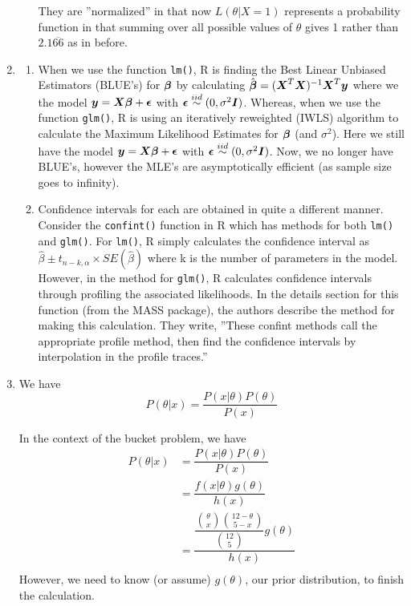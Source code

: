 \documentclass[12pt]{article}\usepackage[]{graphicx}\usepackage[]{color}
\newenvironment{knitrout}{}{} %
\newcommand{\bfbeta}{\mbox{\boldmath $\beta$}}
\newcommand{\bfX}{\mbox{\boldmath $X$}}
\newcommand{\bfI}{\mbox{\boldmath $I$}}
\newcommand{\bfy}{\mbox{\boldmath $y$}}
\newcommand{\bfeps}{\mbox{\boldmath $\epsilon$}}
\begin{document}
\begin{enumerate}
\begin{enumerate}[label=(\alph*)]
\begin{knitrout}
{}



\end{knitrout}

They are ''normalized'' in that now $L(\theta|X=1)$ represents a probability function in that summing over all possible values of $\theta$ gives 1 rather than $2.1\overline{66}$ as in before. 
\end{enumerate}

\item

\begin{enumerate}[label=(\alph*)]
\item 
When we use the function \texttt{lm()}, R is finding the Best Linear Unbiased Estimators (BLUE's) for $\bfbeta$ by calculating $\hat{\bfbeta} = (\bfX^T \bfX)^{-1} \bfX^T \bfy$ where we the model $\bfy = \bfX \bfbeta + \bfeps$  with $\bfeps \overset{iid}{\sim} (0, \sigma^2 \bfI)$. Whereas, when we use the function \texttt{glm()}, R is using an iteratively reweighted (IWLS) algorithm to calculate the Maximum Likelihood Estimates for $\bfbeta$ (and $\sigma^2$). Here we still have the model $\bfy = \bfX \bfbeta + \bfeps$  with $\bfeps \overset{iid}{\sim} (0, \sigma^2 \bfI)$. Now, we no longer have BLUE's, however the MLE's are asymptotically efficient (as sample size goes to infinity). 

\item Confidence intervals for each are obtained in quite a different manner. Consider the \texttt{confint()} function in R which has methods for both \texttt{lm()} and \texttt{glm()}. For \texttt{lm()}, R simply calculates the confidence interval as $\hat{\beta} \pm t_{n-k, \alpha} \times SE(\hat{\beta})$ where k is the number of parameters in the model. However, in the method for \texttt{glm()}, R calculates confidence intervals through profiling the associated likelihoods. In the details section for this function (from the MASS package), the authors describe the method for making this calculation. They write, ''These confint methods call the appropriate profile method, then find the confidence intervals by interpolation in the profile traces.''

\end{enumerate}
\item We have
$$P(\theta | x) = \dfrac{P(x|\theta) P(\theta) }{P(x)} $$

In the context of the bucket problem, we have
\begin{align*}
P(\theta | x) &= \dfrac{P(x|\theta) P(\theta) }{P(x)}\\
&= \dfrac{f(x|\theta) g(\theta) }{h(x)}\\
&= \dfrac{ \dfrac{{ \theta \choose x} {12 - \theta \choose 5 - x}}{{12 \choose 5}} g(\theta) }{h(x)}\\
\end{align*}
However, we need to know (or assume) $g(\theta)$, our prior distribution, to finish the calculation.


\end{enumerate}
\end{document}
